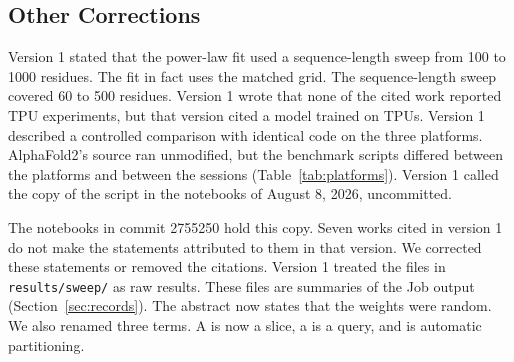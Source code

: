 \subsection*{Other Corrections}
Version 1 stated that the power-law fit used a sequence-length sweep from 100 to 1000 residues. The fit in fact uses the matched grid. %
The sequence-length sweep covered 60 to 500 residues. %
Version 1 wrote that none of the cited work reported TPU experiments, but that version cited a model trained on TPUs.
Version 1 described a controlled comparison with identical code on the three platforms.
AlphaFold2's source ran unmodified, but the benchmark scripts differed between the platforms and between the sessions (Table~\ref{tab:platforms}).
Version 1 called the copy of the script in the notebooks of August 8, 2026, uncommitted. %

The notebooks in commit 2755250 hold this copy. %
Seven works cited in version 1 do not make the statements attributed to them in that version. We corrected these
statements or removed the citations. Version 1 treated the files in \texttt{results/sweep/} as raw results. These files
are summaries of the Job output (Section~\ref{sec:records}). The abstract now states that the weights were random. We
also renamed three terms. A  is now a slice, a  is a query, and  is automatic partitioning.
